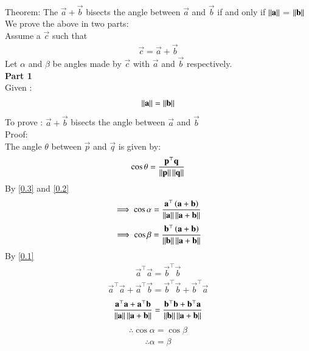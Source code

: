 \documentclass[journal]{IEEEtran}
\begin{document}
	\solution \\
	Theorem: The $\vec{a} + \vec{b}$ bisects the angle between $\vec{a}$ and $\vec{b}$ if and only if $\left\lVert\mathbf{a}\right\rVert$ = $\left\lVert\mathbf{b}\right\rVert$ \\
	We prove the above in two parts:\\
	Assume a $\vec{c}$ such that
	\begin{align}
		\vec{c} = \vec{a} + \vec{b} \label{0.2}
	\end{align}
	Let $\alpha$ and $\beta$ be angles made by $\vec{c}$ with $\vec{a}$ and $\vec{b}$ respectively.\\
	\textbf{Part 1}\\
	Given : 
	\begin{align}
		\left\lVert\mathbf{a}\right\rVert = \left\lVert\mathbf{b}\right\rVert \label{0.1}
	\end{align}
	To prove : $\vec{a} + \vec{b}$ bisects the angle between $\vec{a}$ and $\vec{b}$\\
	Proof: \\	
	The angle $\theta$ between $\vec{p}$ and $\vec{q}$ is given by: 
	\begin{align}
		\cos\theta = \frac{\mathbf{p}^\top\mathbf{q}}{\left\lVert\mathbf{p}\right\rVert\left\lVert\mathbf{q}\right\rVert} \label{0.3}
	\end{align}
	By \eqref{0.3} and \eqref{0.2}
	\begin{align}
		\implies \cos\alpha = \frac{\mathbf{a}^\top\left(\mathbf{a}+\mathbf{b}\right)}{\left\lVert\mathbf{a}\right\rVert\left\lVert\mathbf{a}+\mathbf{b}\right\rVert} 
	\end{align}
	\begin{align}
		\implies \cos\beta = \frac{\mathbf{b}^\top\left(\mathbf{a}+\mathbf{b}\right)}{\left\lVert\mathbf{b}\right\rVert\left\lVert\mathbf{a}+\mathbf{b}\right\rVert} 
	\end{align}
	By \eqref{0.1}
	\begin{align}
		\vec{a}^\top\vec{a} = \vec{b}^\top\vec{b}
	\end{align}
	\begin{align}
		\vec{a}^\top\vec{a} + \vec{a}^\top\vec{b} = \vec{b}^\top\vec{b} + \vec{b}^\top\vec{a}
	\end{align}
	\begin{align}
		\frac{\mathbf{a}^\top\mathbf{a} + \mathbf{a}^\top\mathbf{b}}{\left\lVert\mathbf{a}\right\rVert\left\lVert\mathbf{a}+\mathbf{b}\right\rVert} = \frac{\mathbf{b}^\top\mathbf{b} + \mathbf{b}^\top\mathbf{a}}{\left\lVert\mathbf{b}\right\rVert\left\lVert\mathbf{a}+\mathbf{b}\right\rVert}
	\end{align}
	\begin{align}
		\therefore \cos\alpha=	\cos\beta   \label{angle}
	\end{align}	
	\begin{align}
		\therefore	\alpha=\beta
	\end{align}	
\end{document}
